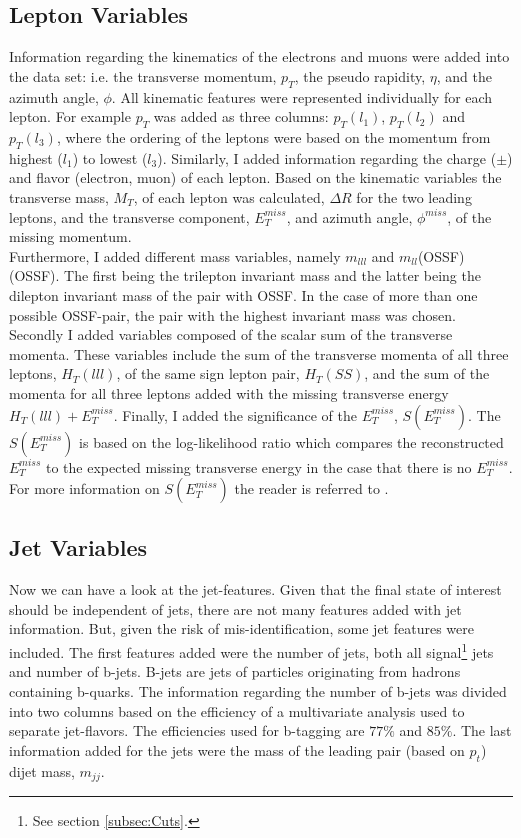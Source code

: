 \subsection{Lepton Variables}\label{subsec:LepSel}
Information regarding the kinematics of the electrons and muons were added into the data set: i.e. the transverse momentum, $p_T$, the pseudo 
rapidity, $\eta$, and the azimuth angle, $\phi$. All kinematic features were represented individually for each lepton. For example $p_T$
was added as three columns: $p_T(l_1)$, $p_T(l_2)$ and $p_T(l_3)$, where the ordering of the leptons were based on the momentum from highest ($l_1$) 
to lowest ($l_3$). Similarly, I added information regarding the charge ($\pm$) and flavor (electron, muon) of each lepton. Based on the kinematic variables
the transverse mass, $M_T$, of each lepton was calculated, $\Delta R$ for the two leading leptons, and the transverse component, $E_T^{miss}$, and azimuth angle,
$\phi^{miss}$, of the missing momentum.
\\
Furthermore, I added different mass variables, namely $m_{lll}$ and $m_{ll}$(\acs{OSSF})(\acl{OSSF}). The first being the trilepton invariant mass 
and the latter being the dilepton invariant mass of the pair with \ac{OSSF}. In the case of more than one possible \ac{OSSF}-pair,
the pair with the highest invariant mass was chosen. Secondly I added variables composed of the scalar sum of the transverse momenta.
These variables include the sum of the transverse momenta of all three leptons, $H_T(lll)$, of the same sign lepton pair, $H_T(SS)$, and the sum of 
the momenta for all three leptons added with the missing transverse energy $H_T(lll) + E_T^{miss}$. Finally, I added the significance of the
$E_T^{miss}$, $S(E_T^{miss})$. The $S(E_T^{miss})$ is based on the log-likelihood ratio which compares the reconstructed $E_T^{miss}$ to 
the expected missing transverse energy in the case that there is no $E_T^{miss}$. For more information on $S(E_T^{miss})$ the reader is 
referred to \cite{object_based_2018}.
\subsection{Jet Variables}\label{subsec:JetSel}
Now we can have a look at the jet-features. Given that the final state of interest should be independent of jets, there are 
not many features added with jet information. But, given the risk of mis-identification, some jet features were included. The 
first features added were the number of jets, both all signal\footnote{See section \ref{subsec:Cuts}.} jets and number of b-jets.
B-jets are jets of particles originating from hadrons containing b-quarks. The information regarding the number of b-jets was divided into 
two columns based on the efficiency of a multivariate analysis used to separate jet-flavors. The efficiencies used for b-tagging are $77\%$ and $85\%$. 
The last information added for the jets were the mass of the leading pair (based on $p_t$) dijet mass, $m_{jj}$.